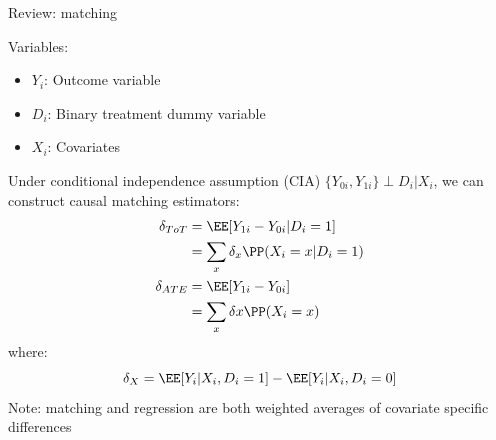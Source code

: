 \documentclass[compress, 8pt]{beamer}
\begin{document}
\begin{frame}{Review: matching}

Variables:
\begin{itemize}
    \item $Y_i$: Outcome variable
    \item $D_i$: Binary treatment dummy variable
    \item $X_i$: Covariates
\end{itemize}
Under conditional independence assumption (CIA) $\{Y_{0i}, Y_{1i}\} \perp D_i \vert X_i$, we can construct causal matching estimators:
\begin{align*}
    \delta_{ToT} &= \EE [Y_{1i} - Y_{0i} \vert D_i = 1] \\
    &= \sum_x \delta_x \PP(X_i = x \vert D_i = 1) \\
    \delta_{ATE} &= \EE [Y_{1i} - Y_{0i}] \\
    &= \sum_x \delta x \PP (X_i = x)
\end{align*}
where:
\begin{equation*}
    \delta_X = \EE [Y_i \vert X_i, D_i = 1] - \EE [Y_i \vert X_i, D_i = 0]
\end{equation*}
Note: matching and regression are both weighted averages of covariate specific differences

\end{frame}






\end{document}
